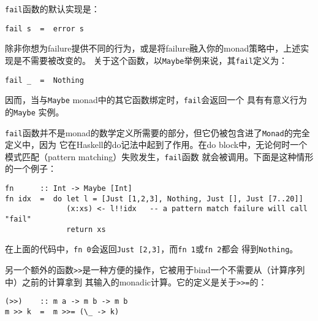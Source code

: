 \indent{}\texttt{fail}函数的默认实现是：
\begin{verbatim}
fail s  =  error s
\end{verbatim}
\noindent{}除非你想为failure提供不同的行为，或是将failure融入你的monad策略中，上述实现是不需要被改变的。
关于这个函数，以\texttt{Maybe}举例来说，其\texttt{fail}定义为：
\begin{verbatim}
fail _  =  Nothing
\end{verbatim}
\noindent{}因而，当与\texttt{Maybe} monad中的其它函数绑定时，\texttt{fail}会返回一个
具有有意义行为的\texttt{Maybe} 实例。

\indent{}\texttt{fail}函数并不是monad的数学定义所需要的部分，但它仍被包含进了\texttt{Monad}的完全定义中，因为
它在Haskell的do记法中起到了作用。在do block中，无论何时一个模式匹配（pattern matching）失败发生，\texttt{fail}函数
就会被调用。下面是这种情形的一个例子：
\begin{verbatim}
fn      :: Int -> Maybe [Int]
fn idx  =  do let l = [Just [1,2,3], Nothing, Just [], Just [7..20]]
              (x:xs) <- l!!idx   -- a pattern match failure will call "fail"
              return xs
\end{verbatim}
\noindent{}在上面的代码中，\texttt{fn 0}会返回\texttt{Just [2,3]}，而\texttt{fn 1}或\texttt{fn 2}都会
得到\texttt{Nothing}。

\indent{}另一个额外的函数\texttt{>>}是一种方便的操作，它被用于bind一个不需要从（计算序列中）之前的计算拿到
其输入的monadic计算。它的定义是关于\texttt{>>=}的：
\begin{verbatim}
(>>)    :: m a -> m b -> m b
m >> k  =  m >>= (\_ -> k)
\end{verbatim}


